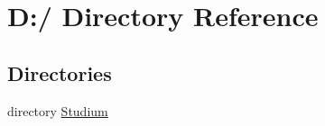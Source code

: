 \hypertarget{dir_D_3A_2F}{
\section{D:/ Directory Reference}
\label{dir_D_3A_2F}
}


\subsection*{Directories}
\begin{CompactItemize}
\item 
directory \hyperlink{dir_D_3A_2FStudium_2F}{Studium}
\end{CompactItemize}
